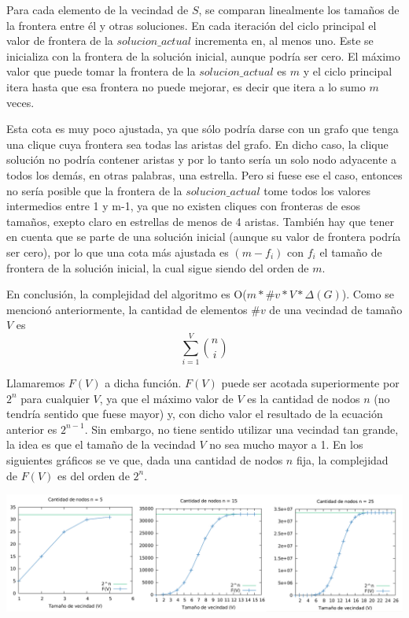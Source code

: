 \par{Para cada elemento de la vecindad de $S$, se comparan
linealmente los tamaños de la frontera entre él y otras soluciones. En cada
iteración del ciclo principal el valor de frontera de la $solucion\_actual$
incrementa en, al menos uno. Este se inicializa con la frontera de la
solución inicial, aunque podría ser cero. El máximo valor que puede tomar la
frontera de la $solucion\_actual$ es $m$ y el ciclo principal itera hasta que
esa frontera no puede mejorar, es decir que itera a lo sumo $m$ veces.}\\

\par{Esta cota es muy poco ajustada, ya que sólo podría darse
con un grafo que tenga una clique cuya frontera sea todas las aristas del
grafo. En dicho caso, la clique solución no podría contener aristas y por lo
tanto sería un solo nodo adyacente a todos los demás, en otras palabras, una
estrella. Pero si fuese ese el caso, entonces no sería posible que la frontera
de la $solucion\_actual$ tome todos los valores intermedios entre 1 y m-1,
ya que no existen cliques con fronteras de esos tamaños, exepto claro
en estrellas de menos de 4 aristas. También hay que tener en cuenta que
se parte de una solución inicial (aunque su valor de frontera podría ser
cero), por lo que una cota más ajustada es $(m-f_i)$ con $f_i$ el tamaño de
frontera de la solución inicial, la cual sigue siendo del orden de $m$.}

\par{En conclusión, la complejidad del algoritmo es O($m * \#v * V*\Delta(G)$).
Como se mencionó anteriormente, la cantidad de elementos $\#v$ de una vecindad
de tamaño $V$ es}
\[
\sum_{i=1}^{V} \binom{n}{i}
\]

\par{Llamaremos $F(V)$ a dicha función. $F(V)$ puede ser acotada superiormente
por $2^n$ para cualquier $V$, ya que el máximo valor de $V$ es la cantidad de
nodos $n$ (no tendría sentido que fuese mayor) y, con dicho valor el resultado
de la ecuación anterior es $2^{n-1}$. Sin embargo, no tiene sentido utilizar
una vecindad tan grande, la idea es que el tamaño de la vecindad $V$ no sea
mucho mayor a 1. En los siguientes gráficos se ve que, dada una cantidad de
nodos $n$ fija, la complejidad de $F(V)$ es del orden de $2^n$.}

\begin{center}
\includegraphics[scale=0.32]{imgs/v.png}
\end{center}

